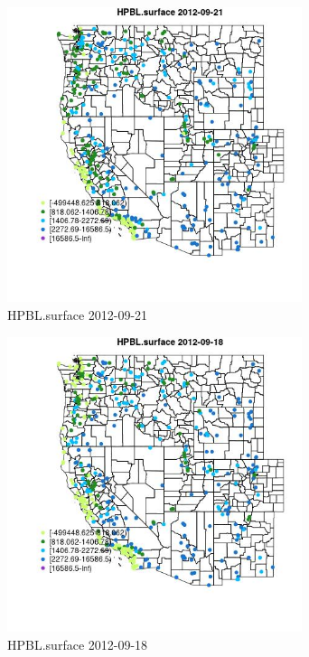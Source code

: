 \begin{figure} 
\centering  
\includegraphics[width=0.77\textwidth]{Code_Outputs/Report_ML_input_PM25_Step4_part_e_de_duplicated_aves_compiled_2019-05-14wNAs_MapObsHPBLsurface2012-09-21.jpg} 
\caption{\label{fig:Report_ML_input_PM25_Step4_part_e_de_duplicated_aves_compiled_2019-05-14wNAsMapObsHPBLsurface2012-09-21}HPBL.surface 2012-09-21} 
\end{figure} 
 

\begin{figure} 
\centering  
\includegraphics[width=0.77\textwidth]{Code_Outputs/Report_ML_input_PM25_Step4_part_e_de_duplicated_aves_compiled_2019-05-14wNAs_MapObsHPBLsurface2012-09-18.jpg} 
\caption{\label{fig:Report_ML_input_PM25_Step4_part_e_de_duplicated_aves_compiled_2019-05-14wNAsMapObsHPBLsurface2012-09-18}HPBL.surface 2012-09-18} 
\end{figure} 
 


